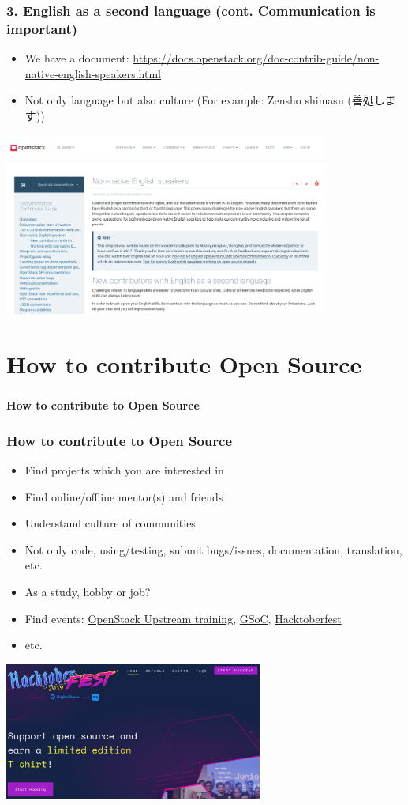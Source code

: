\documentclass[aspectratio=169,11pt,hyperref={colorlinks=true}]{beamer}
\begin{document}
\begin{frame}
  \frametitle{3. English as a second language (cont. Communication is important)}
  \begin{itemize}
    \item We have a document: \url{https://docs.openstack.org/doc-contrib-guide/non-native-english-speakers.html}
    \item Not only language but also culture (For example: Zensho shimasu (善処します))
  \end{itemize}
  \centering\includegraphics[height=60mm]{images/non-native-english-speakers.png}
\end{frame}

\section{How to contribute Open Source}
\begin{frame}
  \frametitle{ }
  \Huge{\bf{How to contribute to Open Source}}
\end{frame}

\begin{frame}
  \frametitle{How to contribute to Open Source}
  \begin{itemize}
    \item Find projects which you are interested in
    \item Find online/offline mentor(s) and friends
    \item Understand culture of communities
    \item Not only code, using/testing, submit bugs/issues, documentation, translation, etc.
    \item As a study, hobby or job?
    \item Find events: \href{https://docs.openstack.org/upstream-training/\#upcoming-trainings}{OpenStack Upstream training},
     \href{https://summerofcode.withgoogle.com/}{GSoC},
     \href{https://hacktoberfest.digitalocean.com/}{Hacktoberfest}
    \item etc.
  \end{itemize}
  \centering\includegraphics[height=45mm]{images/hacktoberfest.png}
\end{frame}
\end{document}
